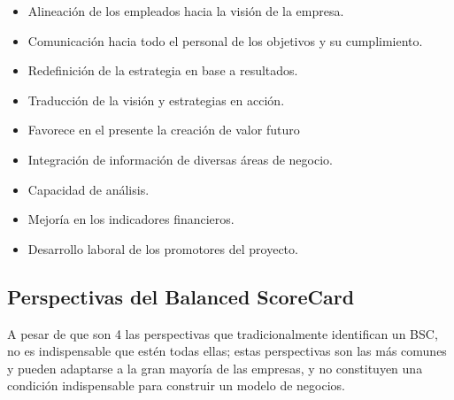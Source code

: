 \documentclass[10pt,a4paper]{article}
\begin{document}
			\begin{itemize}
				\item Alineación de los empleados hacia la visión de la empresa.
				\item Comunicación hacia todo el personal de los objetivos y su cumplimiento.
				\item Redefinición de la estrategia en base a resultados.
				\item Traducción de la visión y estrategias en acción.
				\item Favorece en el presente la creación de valor futuro
				\item Integración de información de diversas áreas de negocio.
				\item Capacidad de análisis.
				\item Mejoría en los indicadores financieros.
				\item Desarrollo laboral de los promotores del proyecto.
			\end{itemize}
		
			\subsection{Perspectivas del Balanced ScoreCard}
			
			A pesar de que son 4 las perspectivas que tradicionalmente identifican un BSC, no es indispensable que estén todas ellas; estas perspectivas son las más comunes y pueden adaptarse a la gran mayoría de las empresas, y no constituyen una condición indispensable para construir un modelo de negocios.
			
\end{document}
